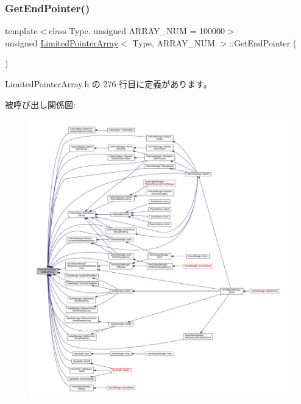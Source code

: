 \subsubsection{\texorpdfstring{Get\+End\+Pointer()}{GetEndPointer()}}
{\footnotesize\ttfamily template$<$class Type, unsigned A\+R\+R\+A\+Y\+\_\+\+N\+UM = 100000$>$ \\
unsigned \mbox{\hyperlink{class_limited_pointer_array}{Limited\+Pointer\+Array}}$<$ Type, A\+R\+R\+A\+Y\+\_\+\+N\+UM $>$\+::Get\+End\+Pointer (\begin{DoxyParamCaption}{ }\end{DoxyParamCaption})\hspace{0.3cm}{\ttfamily [inline]}}



 Limited\+Pointer\+Array.\+h の 276 行目に定義があります。

被呼び出し関係図\+:
\nopagebreak
\begin{figure}[H]
\begin{center}
\leavevmode
\includegraphics[width=350pt]{class_limited_pointer_array_a4c070b87cde4d2ea173aa28918af6223_icgraph}
\end{center}
\end{figure}
\mbox{\label{class_limited_pointer_array_a2b9d42b57662f29f357b2faf1793aa66}} 
